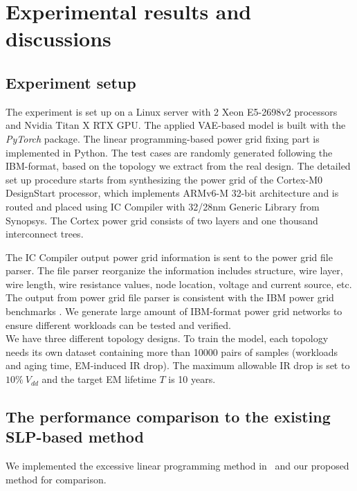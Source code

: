 \section{Experimental results and discussions}
\label{sec:results}
\subsection{Experiment setup}
The experiment is set up on a Linux server with 2 Xeon E5-2698v2
processors and Nvidia Titan X RTX GPU. The applied VAE-based model is built with the {\it PyTorch} package. The linear
programming-based power grid fixing part is implemented in Python. The
test cases are randomly generated following the IBM-format, based on
the topology we extract from the real design. The detailed set up procedure
starts from synthesizing the power grid of the Cortex-M0 DesignStart 
processor, which implements ARMv6-M 32-bit architecture and is routed and placed
using IC Compiler with 32/28nm Generic Library from Synopsys. The Cortex power grid
consists of two layers and one thousand interconnect trees.

The IC Compiler output power grid information is sent to the power grid file parser.
The file parser reorganize the information includes structure, wire layer, wire length, 
wire resistance values, node location, voltage and current source, etc. The output from power grid
file parser is consistent with the IBM power grid benchmarks \cite{Nassif:ASPDAC'08}. We generate 
large amount of IBM-format power grid networks to ensure different workloads can be tested and verified.\\

We have three different topology designs. To train the model, each topology needs its own dataset containing more than 10000 pairs of samples  (workloads and aging time, EM-induced IR drop). The maximum allowable IR drop is set to $10\% \ V_{dd}$ and the target EM lifetime $T$ is 10 years. 







\subsection{The performance comparison to the existing SLP-based method}
We implemented the excessive linear programming method in~\cite{Sukharev:2019pg} and our proposed method for comparison. 

